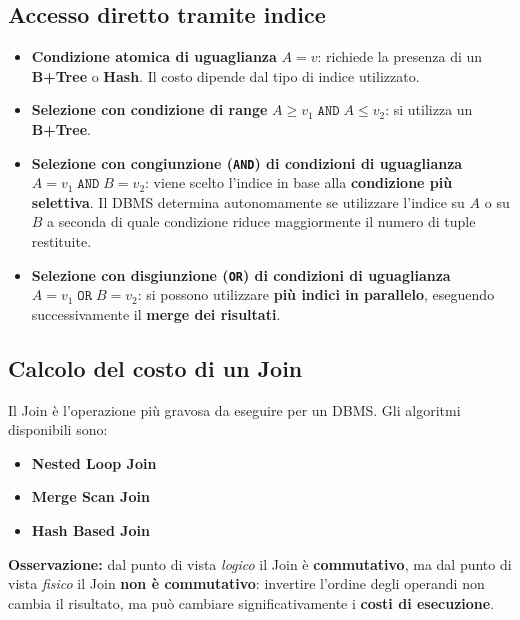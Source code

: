 \subsection{Accesso diretto tramite indice}

\begin{itemize}
	\item \textbf{Condizione atomica di uguaglianza} $A = v$: richiede la presenza di un \textbf{B+Tree} o \textbf{Hash}. Il costo dipende dal tipo di indice utilizzato.
	
	\item \textbf{Selezione con condizione di range} $A \geq v_1 \;\texttt{AND}\; A \leq v_2$: si utilizza un \textbf{B+Tree}.
	
	\item \textbf{Selezione con congiunzione (\texttt{AND}) di condizioni di uguaglianza} $A = v_1 \;\texttt{AND}\; B = v_2$: viene scelto l'indice in base alla \textbf{condizione più selettiva}. Il DBMS determina autonomamente se utilizzare l'indice su $A$ o su $B$ a seconda di quale condizione riduce maggiormente il numero di tuple restituite.
	
	\item \textbf{Selezione con disgiunzione (\texttt{OR}) di condizioni di uguaglianza} $A = v_1 \;\texttt{OR}\; B = v_2$: si possono utilizzare \textbf{più indici in parallelo}, eseguendo successivamente il \textbf{merge dei risultati}.
\end{itemize}
\subsection{Calcolo del costo di un Join}

Il Join è l'operazione più gravosa da eseguire per un DBMS. Gli algoritmi disponibili sono:

\begin{itemize}
	\item \textbf{Nested Loop Join}
	\item \textbf{Merge Scan Join}
	\item \textbf{Hash Based Join}
\end{itemize}

\bigskip
\noindent\textbf{Osservazione:} dal punto di vista \textit{logico} il Join è \textbf{commutativo}, ma dal punto di vista \textit{fisico} il Join \textbf{non è commutativo}: invertire l'ordine degli operandi non cambia il risultato, ma può cambiare significativamente i \textbf{costi di esecuzione}.


